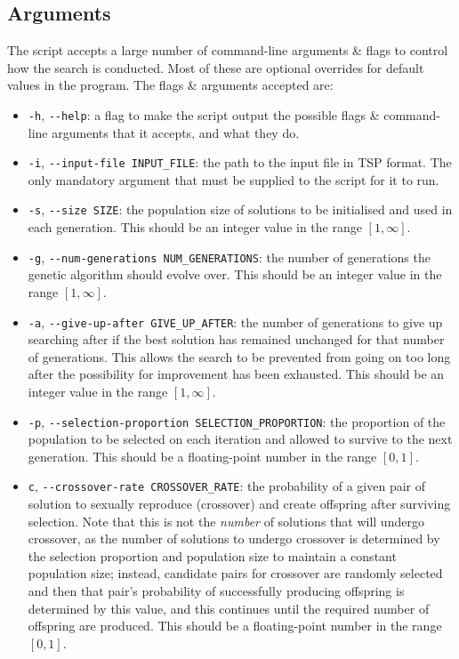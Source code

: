 \documentclass[a4paper]{article}
\begin{document}
\subsection{Arguments}
The script accepts a large number of command-line arguments \& flags to control how the search is conducted.
Most of these are optional overrides for default values in the program.
The flags \& arguments accepted are:
\begin{itemize}
    \item   \verb|-h|, \verb|--help|: a flag to make the script output the possible flags \& command-line arguments that it accepts, and what they do.

    \item   \verb|-i|, \verb|--input-file INPUT_FILE|: the path to the input file in TSP format.
            The only mandatory argument that must be supplied to the script for it to run.

    \item   \verb|-s|, \verb|--size SIZE|: the population size of solutions to be initialised and used in each generation.
            This should be an integer value in the range $[1, \infty]$.

    \item   \verb|-g|, \verb|--num-generations NUM_GENERATIONS|: the number of generations the genetic algorithm should evolve over.
            This should be an integer value in the range $[1, \infty]$.

    \item   \verb|-a|, \verb|--give-up-after GIVE_UP_AFTER|: the number of generations to give up searching after if the best solution has remained unchanged for that number of generations.
            This allows the search to be prevented from going on too long after the possibility for improvement has been exhausted.
            This should be an integer value in the range $[1, \infty]$.

    \item   \verb|-p|, \verb|--selection-proportion SELECTION_PROPORTION|: the proportion of the population to be selected on each iteration and allowed to survive to the next generation.
            This should be a floating-point number in the range $[0, 1]$.

    \item   \verb|c|, \verb|--crossover-rate CROSSOVER_RATE|: the probability of a given pair of solution to sexually reproduce (crossover) and create offspring after surviving selection.
            Note that this is not the \textit{number} of solutions that will undergo crossover, as the number of solutions to undergo crossover is determined by the selection proportion and population size to maintain a constant population size; instead, candidate pairs for crossover are randomly selected and then that pair's probability of successfully producing offspring is determined by this value, and this continues until the required number of offspring are produced.
            This should be a floating-point number in the range $[0, 1]$.


\end{itemize}
\end{document}
